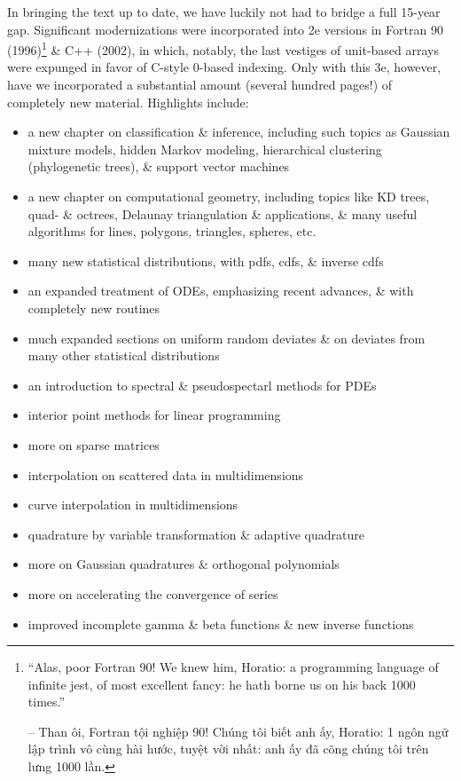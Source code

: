 \documentclass{article}
\begin{document}
\begin{enumerate}
	In bringing the text up to date, we have luckily not had to bridge a full 15-year gap. Significant modernizations were incorporated into 2e versions in Fortran 90 (1996)\footnote{``Alas, poor Fortran 90! We knew him, Horatio: a programming language of infinite jest, of most excellent fancy: he hath borne us on his back 1000 times.''
	
	-- Than ôi, Fortran tội nghiệp 90! Chúng tôi biết anh ấy, Horatio: 1 ngôn ngữ lập trình vô cùng hài hước, tuyệt vời nhất: anh ấy đã cõng chúng tôi trên lưng 1000 lần.} \& C++ (2002), in which, notably, the last vestiges of unit-based arrays were expunged in favor of C-style 0-based indexing. Only with this 3e, however, have we incorporated a substantial amount (several hundred pages!) of completely new material. Highlights include:
	\begin{itemize}
		\item a new chapter on classification \& inference, including such topics as Gaussian mixture models, hidden Markov modeling, hierarchical clustering (phylogenetic trees), \& support vector machines
		\item a new chapter on computational geometry, including topics like KD trees, quad- \& octrees, Delaunay triangulation \& applications, \& many useful algorithms for lines, polygons, triangles, spheres, etc.
		\item many new statistical distributions, with pdfs, cdfs, \& inverse cdfs
		\item an expanded treatment of ODEs, emphasizing recent advances, \& with completely new routines
		\item much expanded sections on uniform random deviates \& on deviates from many other statistical distributions
		\item an introduction to spectral \& pseudospectarl methods for PDEs
		\item interior point methods for linear programming
		\item more on sparse matrices
		\item interpolation on scattered data in multidimensions
		\item curve interpolation in multidimensions
		\item quadrature by variable transformation \& adaptive quadrature
		\item more on Gaussian quadratures \& orthogonal polynomials
		\item more on accelerating the convergence of series
		\item improved incomplete gamma \& beta functions \& new inverse functions

\end{itemize}
\end{enumerate}
\end{document}

